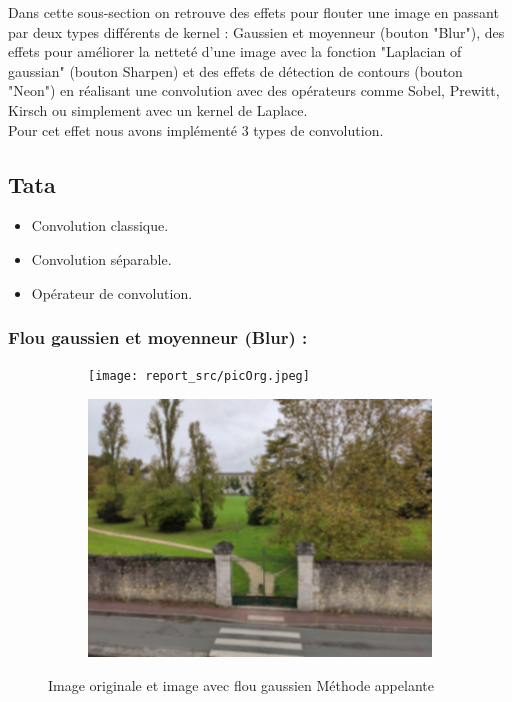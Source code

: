     Dans cette sous-section on retrouve des effets pour flouter une image en passant par deux types différents de kernel : Gaussien et moyenneur
    (bouton "Blur"), des effets pour améliorer la netteté d'une image avec la fonction "Laplacian of gaussian" (bouton Sharpen) et des effets de 
    détection de contours (bouton "Neon") en réalisant une convolution avec des opérateurs comme Sobel, Prewitt, Kirsch ou simplement avec un kernel
    de Laplace.
    \\

    Pour cet effet nous avons implémenté 3 types de convolution.
    \subsection*{Tata}
    

    \begin{itemize}
        \item Convolution classique.
        \item Convolution séparable.
        \item Opérateur de convolution.
    \end{itemize}




    \subsubsection{Flou gaussien et moyenneur (Blur) : }

        \begin{figure}[!h]
            \centering
            \begin{subfigure}[b]{0.4\textwidth}
                \texttt{[image: report\_src/picOrg.jpeg]}
            \end{subfigure}
            \begin{subfigure}[b]{0.4\textwidth}
                \includegraphics[width=1\textwidth]{report_src/blur.jpeg}
            \end{subfigure}
            \caption{Image originale et image avec flou gaussien
                    Méthode appelante }
        \end{figure}





        

